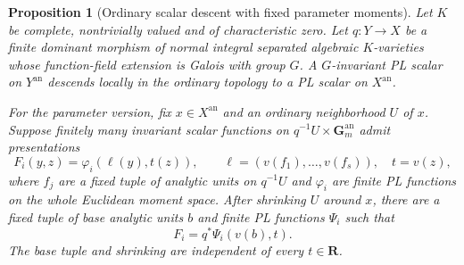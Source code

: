 \documentclass[11pt,a4paper]{article}
\newtheorem{proposition}[theorem]{Proposition}
\theoremstyle{definition}
\theoremstyle{remark}
\newcommand{\R}{\mathbf R}
\newcommand{\an}{\mathrm{an}}
\begin{document}
\begin{proposition}[Ordinary scalar descent with fixed parameter moments]
\label{h22:scalar-descent}
Let $K$ be complete, nontrivially valued and of characteristic zero.
Let $q:Y\to X$ be a finite dominant morphism of normal integral
separated algebraic $K$-varieties whose function-field extension is
Galois with group $G$. A $G$-invariant PL scalar on $Y^{\an}$ descends
locally in the ordinary topology to a PL scalar on $X^{\an}$.

For the parameter version, fix $x\in X^{\an}$ and an ordinary
neighborhood $U$ of $x$. Suppose finitely many invariant scalar
functions on $q^{-1}U\times\mathbf G_m^{\an}$ admit presentations
\[
 F_i(y,z)=\varphi_i(\ell(y),t(z)),\qquad
 \ell=(v(f_1),\ldots,v(f_s)),\quad t=v(z),
\]
where $f_j$ are a fixed tuple of analytic units on $q^{-1}U$ and
$\varphi_i$ are finite PL functions on the whole Euclidean moment
space. After shrinking $U$ around $x$, there are a fixed tuple of base
analytic units $b$ and finite PL functions $\Psi_i$ such that
\[
                  F_i=q^*\Psi_i(v(b),t).
\]
The base tuple and shrinking are independent of every $t\in\R$.
\end{proposition}
\end{document}
